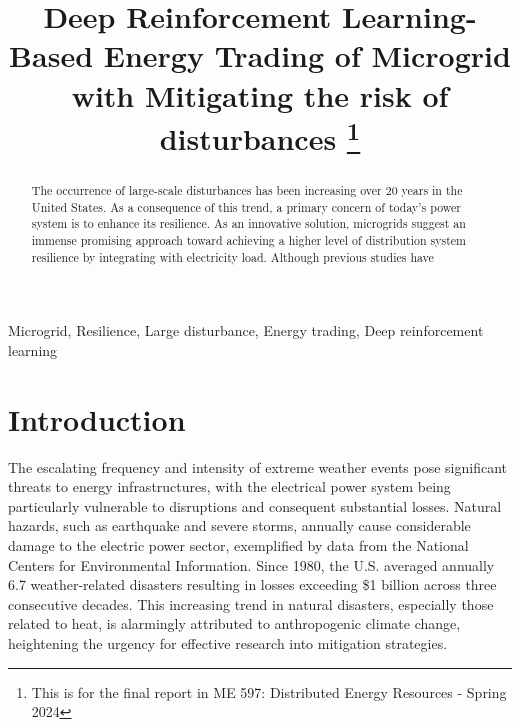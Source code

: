 \documentclass[conference]{IEEEtran}
\begin{document}
\title{Deep Reinforcement Learning-Based Energy Trading of Microgrid with Mitigating the risk of disturbances 
\thanks{This is for the final report in ME 597: Distributed Energy Resources - Spring 2024 }
}

\author{

}

\maketitle

\begin{abstract}
The occurrence of large-scale disturbances has been increasing over 20 years in the United States. As a consequence of this trend, a primary concern of today's power system is to enhance its resilience. As an innovative solution, microgrids suggest an immense promising approach toward achieving a higher level of distribution system resilience by integrating with electricity load. Although previous studies have 
\end{abstract}

\begin{IEEEkeywords}
Microgrid, Resilience, Large disturbance, Energy trading, Deep reinforcement learning
\end{IEEEkeywords}

\section{Introduction}
The escalating frequency and intensity of extreme weather events pose significant threats to energy infrastructures, with the electrical power system being particularly vulnerable to disruptions and consequent substantial losses. Natural hazards, such as earthquake and severe storms, annually cause considerable damage to the electric power sector, exemplified by data from the National Centers for Environmental Information. Since 1980, the U.S. averaged annually 6.7 weather-related disasters resulting in losses exceeding \$1 billion across three consecutive decades. This increasing trend in natural disasters, especially those related to heat, is alarmingly attributed to anthropogenic climate change, heightening the urgency for effective research into mitigation strategies. 
\end{document}
